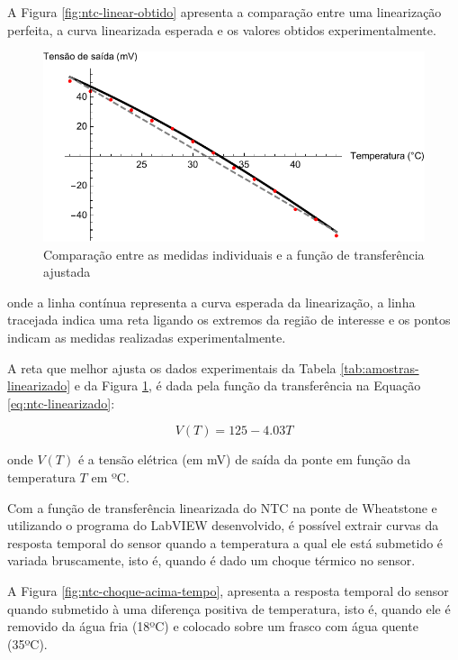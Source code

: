 \documentclass[a4paper]{instrumentacao}
\begin{document}
A Figura \ref{fig:ntc-linear-obtido} apresenta a comparação entre uma linearização perfeita, a curva linearizada esperada e os valores obtidos experimentalmente.

\begin{figure}[H]
\center
\includegraphics[width=\textwidth]{NTC-Linear-Obtido.pdf}
\caption{Comparação entre as medidas individuais e a função de transferência ajustada}
\label{ntc-experimental-comparacao}
\end{figure}

\noindent onde a linha contínua representa a curva esperada da linearização, a linha tracejada indica uma reta ligando os extremos da região de interesse e os pontos indicam as medidas realizadas experimentalmente.

A reta que melhor ajusta os dados experimentais da Tabela \ref{tab:amostras-linearizado} e da Figura \ref{ntc-experimental-comparacao}, é dada pela função da transferência na Equação \ref{eq:ntc-linearizado}:


\begin{equation}
	V(T) = 125 - 4.03 T
	\label{eq:ntc-linearizado}
\end{equation}

\noindent onde $V(T)$ é a tensão elétrica (em mV) de saída da ponte em função da temperatura $T$ em ºC.

Com a função de transferência linearizada do NTC na ponte de Wheatstone e utilizando o programa do LabVIEW desenvolvido, é possível extrair curvas da resposta temporal do sensor quando a temperatura a qual ele está submetido é variada bruscamente, isto é, quando é dado um choque térmico no sensor.

A Figura \ref{fig:ntc-choque-acima-tempo}, apresenta a resposta temporal do sensor quando submetido à uma diferença positiva de temperatura, isto é, quando ele é removido da água fria (18ºC) e colocado sobre um frasco com água quente (35ºC).
\end{document}
